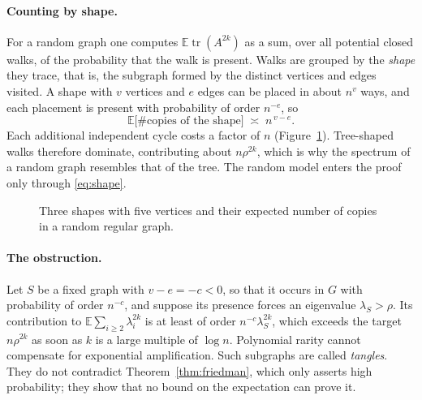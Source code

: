 \documentclass[11pt,letterpaper]{article}
\theoremstyle{definition}
\theoremstyle{remark}
\DeclareMathOperator{\tr}{tr}
\newcommand{\E}{\mathbb{E}}
\begin{document}
\paragraph{Counting by shape.}
For a random graph one computes $\E\tr(A^{2k})$ as a sum, over all potential closed walks, of the
probability that the walk is present. Walks are grouped by the \emph{shape} they trace, that is,
the subgraph formed by the distinct vertices and edges visited. A shape with $v$ vertices and
$e$ edges can be placed in about $n^v$ ways, and each placement is present with probability of
order $n^{-e}$, so
\begin{equation}\label{eq:shape}
  \E\bigl[\#\text{copies of the shape}\bigr]\;\asymp\;n^{\,v-e}.
\end{equation}
Each additional independent cycle costs a factor of $n$ (Figure~\ref{fig:shapes}). Tree-shaped
walks therefore dominate, contributing about $n\rho^{2k}$, which is why the spectrum of a random
graph resembles that of the tree. The random model enters the proof only through
\eqref{eq:shape}.

\begin{figure}[ht]
  \centering
  
  \caption{Three shapes with five vertices and their expected number of copies in a random
  regular graph.}
  \label{fig:shapes}
\end{figure}

\paragraph{The obstruction.}
Let $S$ be a fixed graph with $v-e=-c<0$, so that it occurs in $G$ with probability of order
$n^{-c}$, and suppose its presence forces an eigenvalue $\lambda_S>\rho$. Its contribution to
$\E\sum_{i\ge2}\lambda_i^{2k}$ is at least of order $n^{-c}\lambda_S^{2k}$, which exceeds the
target $n\rho^{2k}$ as soon as $k$ is a large multiple of $\log n$. Polynomial rarity cannot
compensate for exponential amplification. Such subgraphs are called \emph{tangles}. They do not
contradict Theorem~\ref{thm:friedman}, which only asserts high probability; they show that no
bound on the expectation can prove it.
\end{document}
